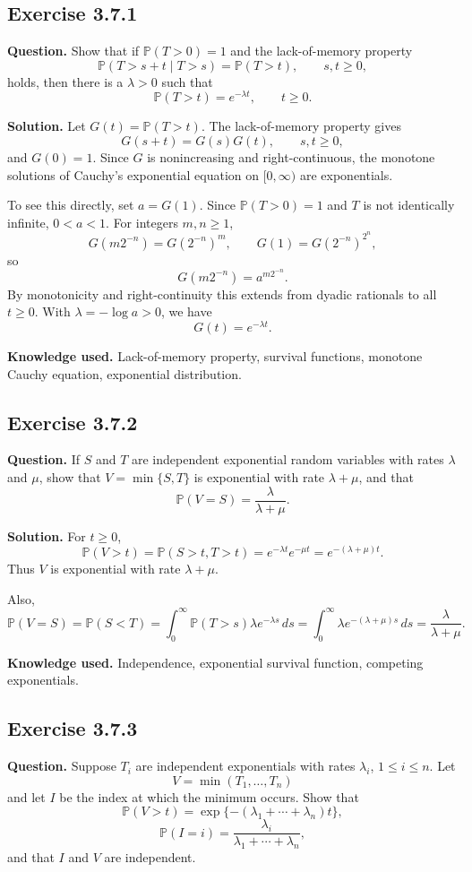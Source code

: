\documentclass[11pt]{article}
\newcommand{\Prob}{\mathbb{P}}
\begin{document}
\subsection*{Exercise 3.7.1}
\textbf{Question.}
Show that if $\Prob(T>0)=1$ and the lack-of-memory property
\[
  \Prob(T>s+t\mid T>s)=\Prob(T>t),\qquad s,t\ge0,
\]
holds, then there is a $\lambda>0$ such that
\[
  \Prob(T>t)=e^{-\lambda t},\qquad t\ge0.
\]

\textbf{Solution.}
Let $G(t)=\Prob(T>t)$.  The lack-of-memory property gives
\[
  G(s+t)=G(s)G(t),\qquad s,t\ge0,
\]
and $G(0)=1$.  Since $G$ is nonincreasing and right-continuous, the
monotone solutions of Cauchy's exponential equation on $[0,\infty)$ are
exponentials.

To see this directly, set $a=G(1)$.  Since $\Prob(T>0)=1$ and $T$ is not
identically infinite, $0<a<1$.  For integers $m,n\ge1$,
\[
  G(m2^{-n})=G(2^{-n})^m,
  \qquad
  G(1)=G(2^{-n})^{2^n},
\]
so
\[
  G(m2^{-n})=a^{m2^{-n}}.
\]
By monotonicity and right-continuity this extends from dyadic rationals
to all $t\ge0$.  With $\lambda=-\log a>0$, we have
\[
  G(t)=e^{-\lambda t}.
\]

\textbf{Knowledge used.}
Lack-of-memory property, survival functions, monotone Cauchy equation,
exponential distribution.

\subsection*{Exercise 3.7.2}
\textbf{Question.}
If $S$ and $T$ are independent exponential random variables with rates
$\lambda$ and $\mu$, show that $V=\min\{S,T\}$ is exponential with rate
$\lambda+\mu$, and that
\[
  \Prob(V=S)=\frac{\lambda}{\lambda+\mu}.
\]

\textbf{Solution.}
For $t\ge0$,
\[
  \Prob(V>t)=\Prob(S>t,T>t)
  =
  e^{-\lambda t}e^{-\mu t}
  =
  e^{-(\lambda+\mu)t}.
\]
Thus $V$ is exponential with rate $\lambda+\mu$.

Also,
\[
  \Prob(V=S)
  =
  \Prob(S<T)
  =
  \int_0^\infty \Prob(T>s)\lambda e^{-\lambda s}\,ds
  =
  \int_0^\infty \lambda e^{-(\lambda+\mu)s}\,ds
  =
  \frac{\lambda}{\lambda+\mu}.
\]

\textbf{Knowledge used.}
Independence, exponential survival function, competing exponentials.

\subsection*{Exercise 3.7.3}
\textbf{Question.}
Suppose $T_i$ are independent exponentials with rates $\lambda_i$,
$1\le i\le n$.  Let
\[
  V=\min(T_1,\ldots,T_n)
\]
and let $I$ be the index at which the minimum occurs.  Show that
\[
  \Prob(V>t)=\exp\{-(\lambda_1+\cdots+\lambda_n)t\},
\]
\[
  \Prob(I=i)=\frac{\lambda_i}{\lambda_1+\cdots+\lambda_n},
\]
and that $I$ and $V$ are independent.
\end{document}
